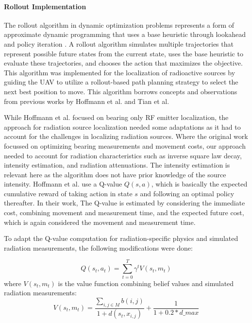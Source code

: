 \documentclass[../report.tex]{subfiles}
\begin{document}
    \paragraph{Rollout Implementation}
    The rollout algorithm in dynamic optimization problems represents a form of approximate dynamic programming that uses a base heuristic through lookahead and policy iteration \cite{bertsekas2013rollout}. 
    A rollout algorithm simulates multiple trajectories that represent possible future states from the current state, uses the base heuristic to evaluate these trajectories, and chooses the 
    action that maximizes the objective. This algorithm was implemented for the localization of radioactive sources by guiding the UAV to utilize a rollout-based path planning strategy to select 
    the next best position to move. This algorithm borrows concepts and observations from previous works by Hoffmann et al. \cite{rolloutHoffmann2019} and Tian et al. \cite{rolloutMultiStepLookaheadTian2008}

    While Hoffmann et al. focused on bearing only RF emitter localization, the approach for radiation source localization needed some adaptations as it had to account for the challenges in localizing 
    radiation sources. Where the original work focussed on optimizing bearing measurements and movement costs, our approach needed to account for radiation characteristics such as
    inverse square law decay, intensity estimation, and radiation attenuations. The intensity estimation is relevant here as the algorithm does not have prior knowledge of the source intensity. 
    Hoffmann et al. use a Q-value $ Q(s, a) $, which is basically the expected cumulative reward of taking action in state $s$ and following an optimal policy thereafter. In their work, 
    The Q-value is estimated by considering the immediate cost, combining movement and measurement time, and the expected future cost, which is again considered the movement and measurement time.
    
    
    To adapt the Q-value computation for radiation-specific physics and simulated radiation measurements, the following modifications were done:

    \begin{equation}
        Q(s_t,a_t) = \sum_{t=0}^{T} \gamma^t V(s_t, m_t)
    \end{equation}
    where $ V(s_t,m_t) $ is the value function combining belief values and simulated radiation measurements:
    \begin{equation}
        V(s_t,m_t) = \frac{\sum_{i,j \in M}b(i,j)}{1 + d(s_t, x_{i,j})} + \frac{1}{1 + 0.2*d\_max}
    \end{equation}
\end{document}

